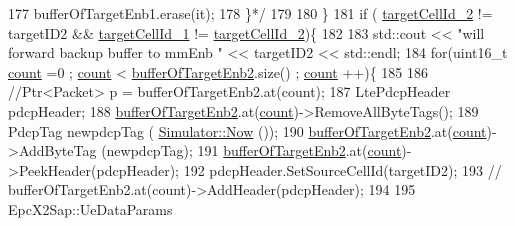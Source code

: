 \begin{DoxyCode}
177 \textcolor{comment}{                        bufferOfTargetEnb1.erase(it);}
178 \textcolor{comment}{                \}*/}
179 
180         \}
181          \textcolor{keywordflow}{if} ( \hyperlink{classns3_1_1McEnbPdcp_a6dc7c7ba7f3f52242b52efd2aac0ac72}{targetCellId\_2} != targetID2 && \hyperlink{classns3_1_1McEnbPdcp_a543097504b40179c297529d19a07165d}{targetCellId\_1} != 
      \hyperlink{classns3_1_1McEnbPdcp_a6dc7c7ba7f3f52242b52efd2aac0ac72}{targetCellId\_2})\{
182 
183                 std::cout << \textcolor{stringliteral}{"will forward backup buffer to mmEnb "} << targetID2 << std::endl;
184                         \textcolor{keywordflow}{for}(uint16\_t \hyperlink{classns3_1_1McEnbPdcp_abd1cb5ff8d1a5c8b5e3d241d1fbd5240}{count} =0 ; \hyperlink{classns3_1_1McEnbPdcp_abd1cb5ff8d1a5c8b5e3d241d1fbd5240}{count} < 
      \hyperlink{classns3_1_1McEnbPdcp_a36253cb41b4763b611e052d3c261c78c}{bufferOfTargetEnb2}.size() ; \hyperlink{classns3_1_1McEnbPdcp_abd1cb5ff8d1a5c8b5e3d241d1fbd5240}{count} ++)\{
185 
186                                                                 \textcolor{comment}{//Ptr<Packet> p =
       bufferOfTargetEnb2.at(count);}
187                                                                 LtePdcpHeader pdcpHeader;
188                                                                  
      \hyperlink{classns3_1_1McEnbPdcp_a36253cb41b4763b611e052d3c261c78c}{bufferOfTargetEnb2}.at(\hyperlink{classns3_1_1McEnbPdcp_abd1cb5ff8d1a5c8b5e3d241d1fbd5240}{count})->RemoveAllByteTags();
189                                                                         PdcpTag newpdcpTag (
      \hyperlink{classns3_1_1Simulator_ac3178fa975b419f7875e7105be122800}{Simulator::Now} ());
190                                                                         
      \hyperlink{classns3_1_1McEnbPdcp_a36253cb41b4763b611e052d3c261c78c}{bufferOfTargetEnb2}.at(\hyperlink{classns3_1_1McEnbPdcp_abd1cb5ff8d1a5c8b5e3d241d1fbd5240}{count})->AddByteTag (newpdcpTag);
191                                                                 
      \hyperlink{classns3_1_1McEnbPdcp_a36253cb41b4763b611e052d3c261c78c}{bufferOfTargetEnb2}.at(\hyperlink{classns3_1_1McEnbPdcp_abd1cb5ff8d1a5c8b5e3d241d1fbd5240}{count})->PeekHeader(pdcpHeader);
192                                                                 pdcpHeader.SetSourceCellId(targetID2);
193                                                         \textcolor{comment}{//      
       bufferOfTargetEnb2.at(count)->AddHeader(pdcpHeader);}
194 
195                                                                 EpcX2Sap::UeDataParams 

\end{DoxyCode}
